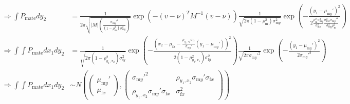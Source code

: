 \documentclass{article}
\newcommand{\x}[1]{\text{#1}}
\begin{document}
\begin{landscape}
\tiny{
\begin{align*}
\Rightarrow \int P_\text{mate} dy_2&=\frac{1}{2\pi\sqrt{|M|\left(\frac{\sigma_{\x{m}y}'^2}{(1-\rho_\x{m}^2)\sigma_{\x{m}y}^2}\right)}}\exp\left(-(v-\nu)^TM^{-1}(v-\nu)\right)\frac{1}{\sqrt{2\pi(1-\rho_\x{m}^2)\sigma_{\x{m}y}^2}}\exp\left(-\frac{(y_1-\mu_{\x{m}y}')^2}{2\frac{\rho_\x{m}^2\sigma_{\x{m}y}^2}{\sigma_{\x{m}x}^2}\frac{\sigma_{\x{m}x}^2\sigma_{\x{m}y}'^2}{\sigma_{\x{m}y}^2\rho_\x{m}^2}}\right)
\\ \Rightarrow \int\int P_\text{mate} dx_1dy_2 &= \frac{1}{\sqrt{2\pi (1-\rho_{y_1,x_2}^2)\sigma_{\x{f}y}^2}}\exp\left(-\frac{\left(x_2-\mu_{\x{f}x}-\frac{\rho_{y_1,x_2}\sigma_{\x{f}x}}{\sigma_{\x{m}y}'}(y_1-\mu_{\x{m}y}')\right)^2}{2(1-\rho_{y_2,x_1}^2)\sigma_{\x{f}y}^2}\right)\frac{1}{\sqrt{2\pi\sigma_{\x{m}y}'^2}}\exp\left(-\frac{(y_1-\mu_{\x{m}y}')^2}{2\sigma_{\x{m}y}'^2}\right)
\\ \Rightarrow \int\int P_\text{mate} dx_1dy_2&\sim N\left(\left(\begin{array}{cc} \mu_{\x{m}y}' \\ \mu_{\x{f}x}\end{array} \right),\left(\begin{array}{cc} \sigma_{\x{m}y}'^2 & \rho_{y_1,x_2}\sigma_{\x{m}y}'\sigma_{\x{f}x} \\ \rho_{y_1,x_2}\sigma_{\x{m}y}'\sigma_{\x{f}x} & \sigma_{\x{f}x}^2\end{array}\right)\right)
\end{align*}
}


\end{landscape}
\end{document}
